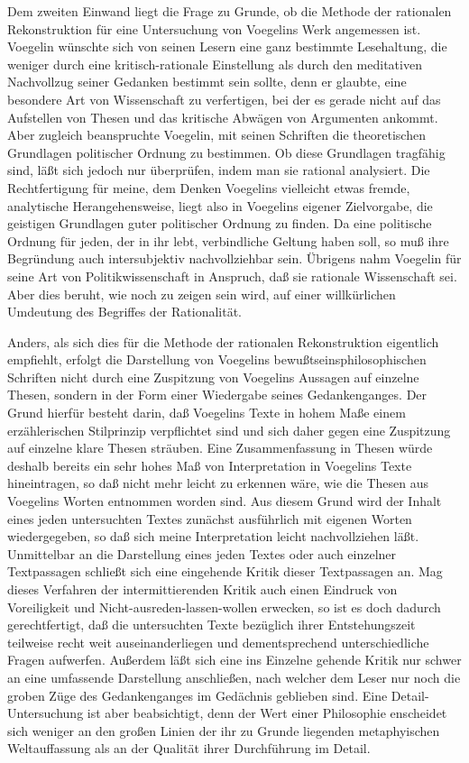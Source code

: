 Dem zweiten Einwand liegt die Frage zu Grunde, ob die Methode der rationalen
Rekonstruktion für eine Untersuchung von Voegelins Werk angemessen ist.
Voegelin wünschte sich von seinen Lesern eine ganz bestimmte
Lesehaltung, die weniger durch eine kritisch-rationale Einstellung als durch
den meditativen Nachvollzug seiner Gedanken bestimmt sein sollte, denn er
glaubte, eine besondere Art von Wissenschaft zu verfertigen, bei der es gerade
nicht auf das Aufstellen von Thesen und das kritische Abwägen von Argumenten
ankommt. Aber zugleich beanspruchte Voegelin, mit seinen Schriften die
theoretischen Grundlagen politischer Ordnung zu bestimmen. Ob diese Grundlagen
tragfähig sind, läßt sich jedoch nur überprüfen, indem man sie rational
analysiert. Die Rechtfertigung für meine, dem Denken Voegelins vielleicht
etwas fremde, analytische Herangehensweise, liegt also in Voegelins eigener
Zielvorgabe, die geistigen Grundlagen guter politischer Ordnung zu finden. Da
eine politische Ordnung für jeden, der in ihr lebt, verbindliche Geltung haben
soll, so muß ihre Begründung auch intersubjektiv nachvollziehbar sein.
Übrigens nahm Voegelin für seine Art von Politikwissenschaft in Anspruch,
daß sie rationale Wissenschaft sei. Aber dies beruht, wie noch zu zeigen sein
wird, auf einer willkürlichen Umdeutung des Begriffes der Rationalität.

Anders, als sich dies für die Methode der rationalen Rekonstruktion eigentlich
empfiehlt, erfolgt die Darstellung von Voegelins bewußtseinsphilosophischen
Schriften nicht durch eine Zuspitzung von Voegelins Aussagen auf einzelne
Thesen, sondern in der Form einer Wiedergabe seines Gedankenganges. Der Grund
hierfür besteht darin, daß Voegelins Texte in hohem Maße einem erzählerischen
Stilprinzip verpflichtet sind und sich daher gegen eine Zuspitzung auf
einzelne klare Thesen sträuben. Eine Zusammenfassung in Thesen würde deshalb
bereits ein sehr hohes Maß von Interpretation in Voegelins Texte hineintragen,
so daß nicht mehr leicht zu erkennen wäre, wie die Thesen aus Voegelins Worten
entnommen worden sind. Aus diesem Grund wird der Inhalt eines jeden
untersuchten Textes zunächst ausführlich mit eigenen Worten wiedergegeben, so
daß sich meine Interpretation leicht nachvollziehen läßt. Unmittelbar an die
Darstellung eines jeden Textes oder auch einzelner Textpassagen schließt sich
eine eingehende Kritik dieser Textpassagen an. Mag dieses Verfahren der
intermittierenden Kritik auch einen Eindruck von Voreiligkeit und
Nicht-ausreden-lassen-wollen erwecken, so ist es doch dadurch gerechtfertigt,
daß die untersuchten Texte bezüglich ihrer Entstehungszeit teilweise recht
weit auseinanderliegen und dementsprechend unterschiedliche Fragen aufwerfen.
Außerdem läßt sich eine ins Einzelne gehende Kritik nur schwer an eine
umfassende Darstellung anschließen, nach welcher dem Leser nur noch die groben
Züge des Gedankenganges im Gedächnis geblieben sind. Eine Detail-Untersuchung
ist aber beabsichtigt, denn der Wert einer Philosophie enscheidet sich weniger
an den großen Linien der ihr zu Grunde liegenden metaphyischen Weltauf\/fassung
als an der Qualität ihrer Durchführung im Detail. 

